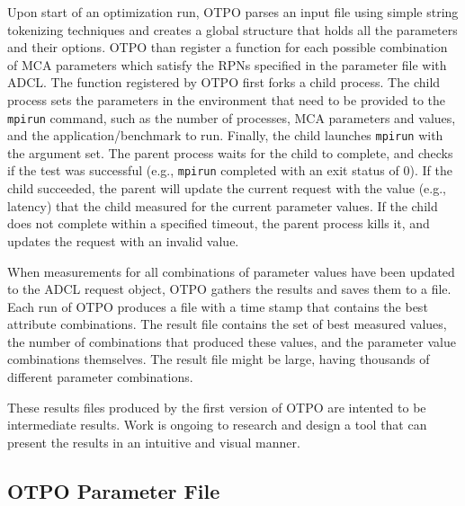 
Upon start of an optimization run, OTPO parses an input file using simple string tokenizing
techniques and creates a global structure that holds all the
parameters and their options. OTPO than register a function for each possible combination of MCA parameters which satisfy the RPNs specified in the parameter file with ADCL. The function registered by OTPO first forks a child process. The child process sets the parameters in the environment that
need to be provided to the {\tt mpirun} command, such as the number of processes, MCA parameters and values, and the   application/benchmark to run. Finally, the child launches {\tt mpirun} with the argument set. The parent process waits for the child to complete, and checks if the test was successful (e.g., {\tt mpirun} completed with an exit status of 0). If the child succeeded, the parent will update the current request with the value (e.g., latency) that the child measured for the current parameter values. If the child does not complete within a specified timeout, the parent process kills it, and updates the request with an invalid value.

When measurements for all combinations of parameter values have been
updated to the ADCL request object, OTPO gathers the results and saves
them to a file. Each run of OTPO produces a file with a time stamp
that contains the best attribute combinations. The result file
contains the set of best measured values, the number of combinations
that produced these values, and the parameter value combinations
themselves. The result file might be large, having thousands of
different parameter combinations.

These results files produced by the first version of OTPO are intented
to be intermediate results.  Work is ongoing to research and design a
tool that can present the results in an intuitive and visual manner.


\subsection{OTPO Parameter File}

